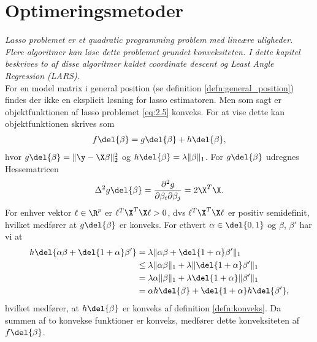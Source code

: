 \chapter{Optimeringsmetoder} \label{kap:optimeringsmetoder}
\textit{Lasso problemet er et quadratic programming problem med lineære uligheder. 
Flere algoritmer kan løse dette problemet grundet konveksiteten.  
I dette kapitel beskrives to af disse algoritmer kaldet coordinate descent og Least Angle Regression (LARS).} \\[4mm]
%
For en model matrix i general position (se definition \ref{defn:general_position}) findes der ikke en eksplicit løsning for lasso estimatoren.
Men som sagt er objektfunktionen af lasso problemet \eqref{eq:2.5} konveks.
For at vise dette kan objektfunktionen skrives som
\begin{align*}
f \del{\beta} = g \del{\beta} + h \del{\beta},
\end{align*}
hvor \(g \del{\beta} = \Vert \y - \X \beta \Vert_2^2\) og \(h \del{\beta} = \lambda \Vert \beta \Vert_1\).
For \(g \del{\beta}\) udregnes Hessematricen
\begin{align*}
\Delta^2 g \del{\beta} = \frac{\partial^2 g }{\partial \beta_i \partial \beta_j} = 2 \X^T \X.
\end{align*}
For enhver vektor \(\ell \in \R^p\) er \(\ell^T \X^T \X \ell > 0\), dvs \(\ell^T \X^T \X \ell \) er positiv semidefinit, hvilket medfører at \(g \del{\beta}\) er konveks.
For ethvert \(\alpha \in \del{0,1}\) og \(\beta\), \(\beta'\) har vi at
\begin{align*}
h \del{\alpha \beta + \del{1+\alpha}\beta'} &= \lambda \Vert \alpha \beta + \del{1+\alpha} \beta' \Vert_1 \\
&\leq \lambda \Vert \alpha \beta \Vert_1 + \lambda \Vert \del{1+\alpha} \beta' \Vert_1 \\
&= \lambda \alpha \Vert \beta \Vert_1 + \lambda \del{1+\alpha} \Vert \beta' \Vert_1 \\
&= \alpha h \del{\beta} + \del{1+\alpha} h \del{\beta'},
\end{align*}
hvilket medfører, at \(h \del{\beta}\) er konveks af definition \ref{defn:konveks}.
Da summen af to konvekse funktioner er konveks, medfører dette konveksiteten af \(f \del{\beta}\). 

